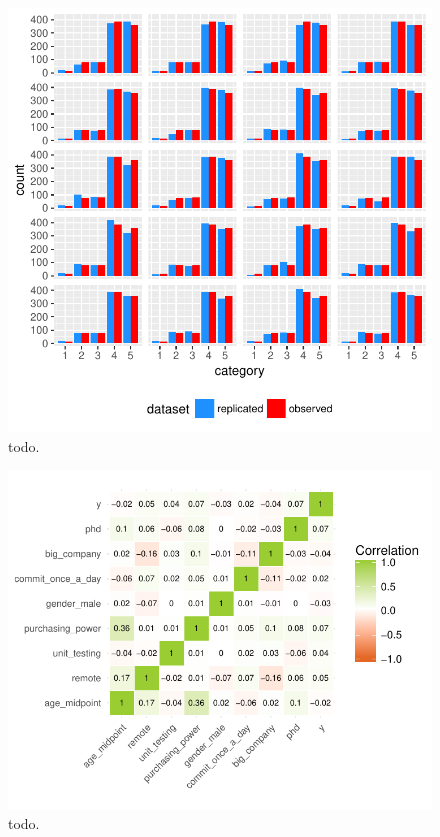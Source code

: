 \documentclass{article}
\begin{document}
\begin{figure}[H]
\centering
\includegraphics{report-017}
\caption{todo.}\label{fig_3}
\end{figure}


\begin{figure}[H]
\centering
\includegraphics{report-019}
\caption{todo.}\label{fig_4}
\end{figure}
\end{document}
